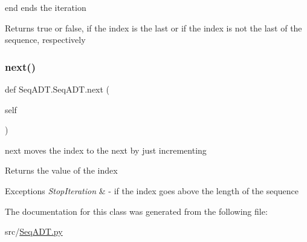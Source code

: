 end ends the iteration 

\begin{DoxyReturn}{Returns}
true or false, if the index is the last or if the index is not the last of the sequence, respectively 
\end{DoxyReturn}
\mbox{\label{class_seq_a_d_t_1_1_seq_a_d_t_a1d2ee97ccd784507ae32c00150dc6fb0}} 
\subsubsection{\texorpdfstring{next()}{next()}}
{\footnotesize\ttfamily def Seq\+A\+D\+T.\+Seq\+A\+D\+T.\+next (\begin{DoxyParamCaption}\item[{}]{self }\end{DoxyParamCaption})}



next moves the index to the next by just incrementing 

\begin{DoxyReturn}{Returns}
the value of the index 
\end{DoxyReturn}

\begin{DoxyExceptions}{Exceptions}
{\em Stop\+Iteration} & -\/ if the index goes above the length of the sequence \\
\hline
\end{DoxyExceptions}


The documentation for this class was generated from the following file\+:\begin{DoxyCompactItemize}
\item 
src/\mbox{\hyperlink{_seq_a_d_t_8py}{Seq\+A\+D\+T.\+py}}\end{DoxyCompactItemize}
